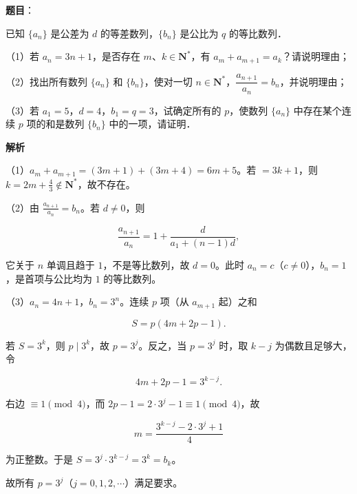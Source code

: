\begin{answer}

\textbf{题目}：

已知 $\{a_n\}$ 是公差为 $d$ 的等差数列，$\{b_n\}$ 是公比为 $q$ 的等比数列．

（1）若 $a_n=3n+1$，是否存在 $m$、$k\in\mathbf N^*$，有 $a_m+a_{m+1}=a_k$？请说明理由；

（2）找出所有数列 $\{a_n\}$ 和 $\{b_n\}$，使对一切 $n\in\mathbf N^*$，$\dfrac{a_{n+1}}{a_n}=b_n$，并说明理由；

（3）若 $a_1=5$，$d=4$，$b_1=q=3$，试确定所有的 $p$，使数列 $\{a_n\}$ 中存在某个连续 $p$ 项的和是数列 $\{b_n\}$ 中的一项，请证明．

\textbf{解析}

（1）$a_m+a_{m+1}=(3m+1)+(3m+4)=6m+5$。若 $=3k+1$，则 $k=2m+\frac43\notin\mathbf N^*$，故不存在。

（2）由 $\frac{a_{n+1}}{a_n}=b_n$。若 $d\neq0$，则

\nopagebreak[4]
\[\frac{a_{n+1}}{a_n}=1+\frac{d}{a_1+(n-1)d},\]

它关于 $n$ 单调且趋于 $1$，不是等比数列，故 $d=0$。此时 $a_n=c$（$c\neq0$），$b_n=1$，是首项与公比均为 $1$ 的等比数列。

（3）$a_n=4n+1$，$b_n=3^n$。连续 $p$ 项（从 $a_{m+1}$ 起）之和

\nopagebreak[4]
\[S=p(4m+2p-1).\]

若 $S=3^k$，则 $p\mid3^k$，故 $p=3^j$。反之，当 $p=3^j$ 时，取 $k-j$ 为偶数且足够大，令

\nopagebreak[4]
\[4m+2p-1=3^{k-j}.\]

右边 $\equiv1\pmod4$，而 $2p-1=2\cdot3^j-1\equiv1\pmod4$，故

\nopagebreak[4]
\[m=\frac{3^{k-j}-2\cdot3^j+1}{4}\]

为正整数。于是 $S=3^j\cdot3^{k-j}=3^k=b_k$。

故所有 $p=3^j$（$j=0,1,2,\cdots$）满足要求。


\end{answer}